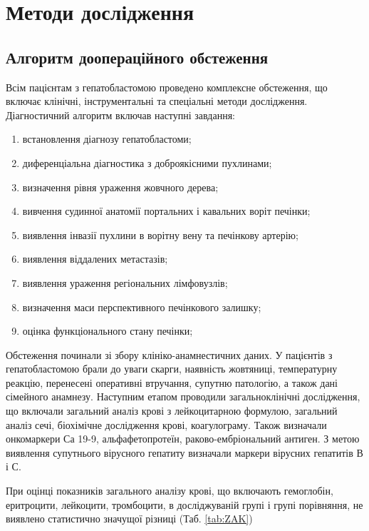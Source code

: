 \section{Методи дослідження}
\subsection{Алгоритм доопераційного обстеження}

Всім пацієнтам з гепатобластомою проведено комплексне обстеження, що включає клінічні, інструментальні та спеціальні методи дослідження.
Діагностичний алгоритм включав наступні завдання:
\begin{enumerate}
    \item встановлення діагнозу гепатобластоми;
    \item диференціальна діагностика з доброякісними пухлинами;
    \item визначення рівня ураження жовчного дерева;
    \item вивчення судинної анатомії портальних і кавальних воріт печінки;
    \item виявлення інвазії пухлини в ворітну вену та печінкову артерію;
    \item виявлення віддалених метастазів;
    \item виявлення ураження регіональних лімфовузлів;
    \item визначення маси перспективного печінкового залишку;
    \item оцінка функціонального стану печінки;
\end{enumerate}

Обстеження починали зі збору клініко-анамнестичних даних. У пацієнтів з гепатобластомою брали до уваги скарги, наявність жовтяниці, температурну реакцію, перенесені оперативні втручання, супутню патологію, а також дані сімейного анамнезу. Наступним етапом проводили загальноклінічні дослідження, що включали загальний аналіз крові з лейкоцитарною формулою, загальний аналіз сечі, біохімічне дослідження крові, коагулограму. Також визначали онкомаркери Са 19-9, альфафетопротеїн, раково-ембріональний антиген. З метою виявлення супутнього вірусного гепатиту визначали маркери вірусних гепатитів В і С.

При оцінці показників загального аналізу крові, що включають гемоглобін, еритроцити, лейкоцити, тромбоцити, в досліджуваній групі і групі порівняння, не виявлено статистично значущої різниці (Таб. \ref{tab:ZAK})


